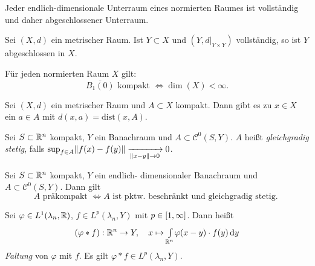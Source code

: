 \documentclass{cheat-sheet}
\newcommand{\dist}{\mathrm{dist}} %
\begin{document}
\begin{lem}
  Jeder endlich-dimensionale Unterraum eines normierten Raumes ist vollständig und daher abgeschlossener Unterraum.
\end{lem}

\begin{lem}
  Sei $(X, d)$ ein metrischer Raum. Ist $Y \subset X$ und $(Y, d|_{Y \times Y})$ vollständig, so ist $Y$ abgeschlossen in $X$.
\end{lem}

\begin{satz}
  Für jeden normierten Raum $X$ gilt:
  \[ \overline{B_1(0)} \text{ kompakt } \iff \dim(X) < \infty. \]
\end{satz}


\begin{satz}
  Sei $(X, d)$ ein metrischer Raum und $A \subset X$ kompakt. Dann gibt es zu $x \in X$ ein $a \in A$ mit $d(x, a) = \dist(x, A)$.
\end{satz}

\begin{defn}
  Sei $S \subset \mathbb{R}^n$ kompakt, $Y$ ein Banachraum und $A \subset \mathcal{C}^0(S, Y)$.
  $A$ heißt \emph{gleichgradig stetig}, falls $\sup_{f \in A} \lVert f(x) - f(y)\rVert \xrightarrow[\lVert x - y\rVert \to 0]{} 0$.
\end{defn}

\begin{satz}
  Sei $S \subset \mathbb{R}^n$ kompakt, $Y$ ein endlich- dimensionaler Banachraum und $A \subset \mathcal{C}^0(S, Y)$. Dann gilt
  \[ A \text{ präkompakt } \iff A \text{ ist pktw. beschränkt und gleichgradig stetig. } \]
\end{satz}




\begin{defn}
  Sei $\varphi \in L^1(\lambda_n, \mathbb{R})$, $f \in L^p(\lambda_n, Y)$ mit $p \in \left[ 1, \infty \right]$. Dann heißt
  \[ (\varphi * f) : \mathbb{R}^n \to Y, \quad x \mapsto {\textstyle \int\limits_{\mathbb{R}^n}^{}} \varphi(x - y) \cdot f(y) \,\mathrm{d} y \]
  \emph{Faltung} von $\varphi$ mit $f$. Es gilt $\varphi * f \in L^p(\lambda_n, Y)$.
\end{defn}
\end{document}
